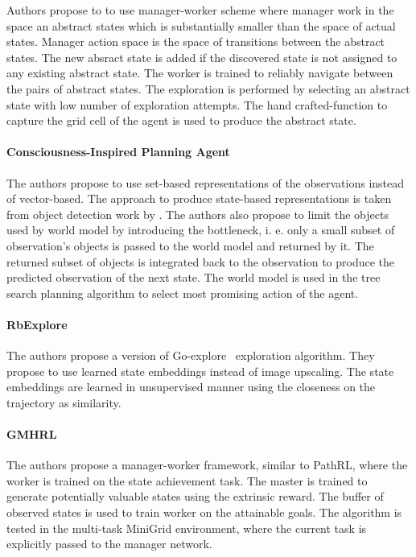 \documentclass[acmsmall, nonacm]{acmart}
\begin{document}
Authors propose to to use manager-worker scheme where manager work in the space an abstract states which is substantially smaller than the space of actual states. Manager action space is the space of transitions between the abstract states. The new absract state is  added if the discovered state is not assigned to any existing abstract state. The worker is trained to reliably navigate between the pairs of abstract states. The exploration is performed by selecting an abstract state with low number of exploration attempts. The hand crafted-function to capture the grid cell of the agent is used to produce the abstract state.


\paragraph{Consciousness-Inspired Planning Agent \citet{Zhao2021ACP}}

The authors propose to use set-based representations of the observations instead of vector-based. The approach to produce state-based representations is taken from object detection work by \citet{Carion2020EndtoEndOD}. The authors also propose to limit the objects used by world model by introducing the bottleneck, i. e. only a small subset of observation's objects is passed to the world model and returned by it. The returned subset of objects is integrated back to the observation to produce the predicted observation of the next state. The world model is used in the tree search planning algorithm to select most promising action of the agent.


\paragraph{RbExplore \citet{Ugadiarov2021LongTermEI}}

The authors propose a version of Go-explore~\citet{ecoffet_first_2021} exploration algorithm. They propose to use learned state embeddings instead of image upscaling. The state embeddings are learned in unsupervised manner using the closeness on the trajectory as similarity.


\paragraph{GMHRL \citet{chen2019learning}}

The authors propose a manager-worker framework, similar to PathRL, where the worker is trained on the state achievement task. The master is trained to generate potentially valuable states using the extrinsic reward. The buffer of observed states is used to train worker on the attainable goals. The algorithm is tested in the multi-task MiniGrid environment, where the current task is explicitly passed to the manager network.


\medskip



\end{document}
